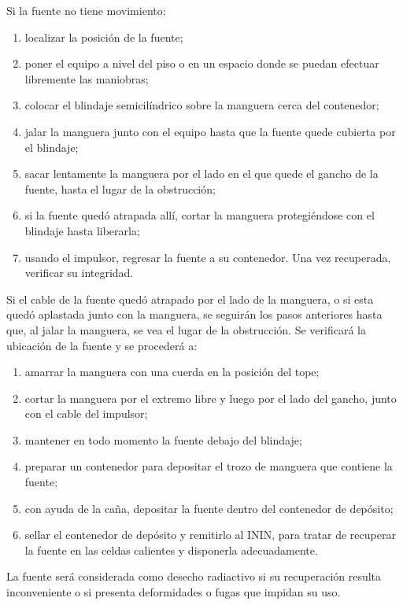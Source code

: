 Si la fuente no tiene movimiento:
\begin{enumerate}[label=\alph*)]
  \item localizar la posición de la fuente;
  \item poner el equipo a nivel del piso o en un espacio donde se puedan efectuar libremente las maniobras;
  \item colocar el blindaje semicilíndrico sobre la manguera cerca del contenedor;
  \item jalar la manguera junto con el equipo hasta que la fuente quede cubierta por el blindaje;
  \item sacar lentamente la manguera por el lado en el que quede el gancho de la fuente, hasta el lugar de la obstrucción;
  \item si la fuente quedó atrapada allí, cortar la manguera protegiéndose con el blindaje hasta liberarla;
  \item usando el impulsor, regresar la fuente a su contenedor. Una vez recuperada, verificar su integridad.
\end{enumerate}

Si el cable de la fuente quedó atrapado por el lado de la manguera, o si esta quedó aplastada junto con la manguera, se seguirán los pasos anteriores hasta que, al jalar la manguera, se vea el lugar de la obstrucción. Se verificará la ubicación de la fuente y se procederá a:
\begin{enumerate}[label=\alph*)]
  \item amarrar la manguera con una cuerda en la posición del tope;
  \item cortar la manguera por el extremo libre y luego por el lado del gancho, junto con el cable del impulsor;
  \item mantener en todo momento la fuente debajo del blindaje;
  \item preparar un contenedor para depositar el trozo de manguera que contiene la fuente;
  \item con ayuda de la caña, depositar la fuente dentro del contenedor de depósito;
  \item sellar el contenedor de depósito y remitirlo al ININ, para tratar de recuperar la fuente en las celdas calientes y disponerla adecuadamente.
\end{enumerate}

La fuente será considerada como desecho radiactivo si su recuperación resulta inconveniente o si presenta deformidades o fugas que impidan su uso.

